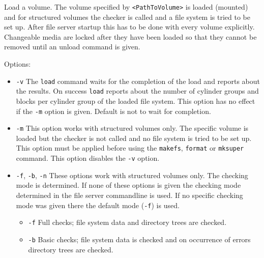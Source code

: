 \begin{man}
  \PP Load a volume.
  \DE The volume specified by {\tt <PathToVolume>} is loaded (mounted)
             and for structured volumes the checker is called and a file system
             is tried to be set up.
             After file server startup this has to be done with every volume
             explicitly.
             Changeable media are locked after they have been loaded so that
             they cannot be removed until an unload command is given.

             Options:
             \begin{itemize}

             \item {\tt -v}\newline
               The {\tt load} command waits for the completion of the load and
               reports about the results. On success {\tt load} reports about the
               number of cylinder groups and blocks per cylinder group of the
               loaded file system. This option has no effect if the {\tt -m} option
               is given. Default is not to wait for completion.

             \item {\tt -m}\newline
               This option works with structured volumes only.
	       The specific volume is loaded but the checker is not called and
	       no file system is tried to be set up. This option must be applied
	       before using the {\tt makefs}, {\tt format} or {\tt mksuper} command.
	       This option disables the {\tt -v} option.

             \item {\tt -f}, {\tt -b}, {\tt -n}\newline
               These options work with structured volumes only.
	       The checking mode is determined. If none of these options is
	       given the checking mode determined in the file server commandline
	       is used. If no specific checking mode was given there the 
               default mode ({\tt -f}) is used.

               \begin{itemize}
               \item {\tt -f}\newline
                 Full checks; file system data and directory trees are checked.

               \item {\tt -b}\newline
                 Basic checks; file system data is checked and on occurrence of
	         errors directory trees are checked.


\end{itemize}
\end{itemize}
\end{man}
